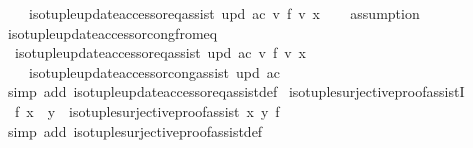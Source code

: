 \begin{isabellebody}
\ \ \ \ iso{\isacharunderscore}{\kern0pt}tuple{\isacharunderscore}{\kern0pt}update{\isacharunderscore}{\kern0pt}accessor{\isacharunderscore}{\kern0pt}eq{\isacharunderscore}{\kern0pt}assist\ upd\ ac\ v\ f\ v{\isacharprime}{\kern0pt}\ x{\isachardoublequoteclose}\isanewline
%
\isadelimproof
\ \ %
\endisadelimproof
%
\isatagproof
{}\isamarkupfalse%
\ assumption%
\endisatagproof
{\isafoldproof}%
%
\isadelimproof
\isanewline
%
\endisadelimproof
\isanewline
{}\isamarkupfalse%
\ iso{\isacharunderscore}{\kern0pt}tuple{\isacharunderscore}{\kern0pt}update{\isacharunderscore}{\kern0pt}accessor{\isacharunderscore}{\kern0pt}cong{\isacharunderscore}{\kern0pt}from{\isacharunderscore}{\kern0pt}eq{\isacharcolon}{\kern0pt}\isanewline
\ \ {\isachardoublequoteopen}iso{\isacharunderscore}{\kern0pt}tuple{\isacharunderscore}{\kern0pt}update{\isacharunderscore}{\kern0pt}accessor{\isacharunderscore}{\kern0pt}eq{\isacharunderscore}{\kern0pt}assist\ upd\ ac\ v\ f\ v{\isacharprime}{\kern0pt}\ x\ {\isasymLongrightarrow}\isanewline
\ \ \ \ iso{\isacharunderscore}{\kern0pt}tuple{\isacharunderscore}{\kern0pt}update{\isacharunderscore}{\kern0pt}accessor{\isacharunderscore}{\kern0pt}cong{\isacharunderscore}{\kern0pt}assist\ upd\ ac{\isachardoublequoteclose}\isanewline
%
\isadelimproof
\ \ %
\endisadelimproof
%
\isatagproof
{}\isamarkupfalse%
\ {\isacharparenleft}{\kern0pt}simp\ add{\isacharcolon}{\kern0pt}\ iso{\isacharunderscore}{\kern0pt}tuple{\isacharunderscore}{\kern0pt}update{\isacharunderscore}{\kern0pt}accessor{\isacharunderscore}{\kern0pt}eq{\isacharunderscore}{\kern0pt}assist{\isacharunderscore}{\kern0pt}def{\isacharparenright}{\kern0pt}%
\endisatagproof
{\isafoldproof}%
%
\isadelimproof
\isanewline
%
\endisadelimproof
\isanewline
{}\isamarkupfalse%
\ iso{\isacharunderscore}{\kern0pt}tuple{\isacharunderscore}{\kern0pt}surjective{\isacharunderscore}{\kern0pt}proof{\isacharunderscore}{\kern0pt}assistI{\isacharcolon}{\kern0pt}\isanewline
\ \ {\isachardoublequoteopen}f\ x\ {\isacharequal}{\kern0pt}\ y\ {\isasymLongrightarrow}\ iso{\isacharunderscore}{\kern0pt}tuple{\isacharunderscore}{\kern0pt}surjective{\isacharunderscore}{\kern0pt}proof{\isacharunderscore}{\kern0pt}assist\ x\ y\ f{\isachardoublequoteclose}\isanewline
%
\isadelimproof
\ \ %
\endisadelimproof
%
\isatagproof
{}\isamarkupfalse%
\ {\isacharparenleft}{\kern0pt}simp\ add{\isacharcolon}{\kern0pt}\ iso{\isacharunderscore}{\kern0pt}tuple{\isacharunderscore}{\kern0pt}surjective{\isacharunderscore}{\kern0pt}proof{\isacharunderscore}{\kern0pt}assist{\isacharunderscore}{\kern0pt}def{\isacharparenright}{\kern0pt}%

\end{isabellebody}
